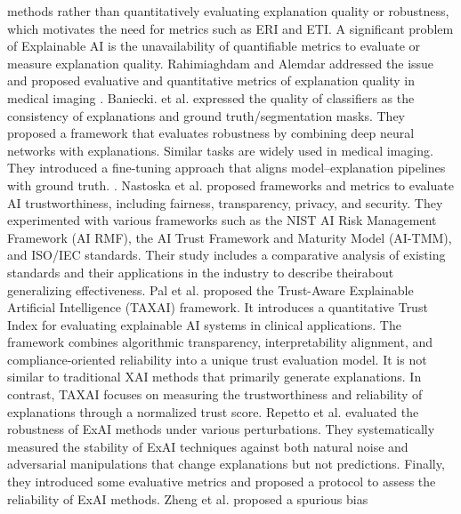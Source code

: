 \documentclass[a4paper,fleqn]{cas-dc}
\begin{document}
methods rather than quantitatively evaluating explanation quality or robustness, which motivates the need for metrics such as ERI and ETI. A significant problem of Explainable AI is the unavailability of quantifiable metrics to evaluate or measure explanation quality. Rahimiaghdam and Alemdar addressed the issue and proposed evaluative and quantitative metrics of explanation quality in medical imaging \cite{r21}. Baniecki.
et al. expressed the quality of classifiers as the consistency of explanations and ground truth/segmentation masks. They proposed a framework that evaluates robustness by combining deep neural networks with explanations. Similar tasks are widely used in medical imaging. They introduced a fine-tuning approach that aligns model–explanation pipelines with ground truth. \cite{r22}. Nastoska et al. proposed frameworks and metrics to evaluate AI trustworthiness, including fairness, transparency, privacy, and security\cite{r23}. They experimented with various frameworks such as the NIST AI Risk Management Framework (AI RMF), the AI Trust Framework and Maturity Model (AI-TMM), and ISO/IEC standards. Their study includes a comparative analysis of existing standards and their applications in the industry to describe theirabout generalizing effectiveness. Pal et al. proposed the Trust-Aware Explainable Artificial Intelligence (TAXAI) framework. It introduces a quantitative Trust Index for evaluating explainable AI systems in clinical applications\cite{r24}. The framework combines algorithmic transparency, interpretability alignment, and compliance-oriented reliability into a unique trust evaluation model. It is not similar to traditional XAI methods that primarily generate explanations. In contrast, TAXAI focuses on measuring the trustworthiness and reliability of explanations through a normalized trust score. Repetto et al. evaluated the robustness of ExAI methods under various perturbations. They systematically measured the stability of ExAI techniques against both natural noise and adversarial manipulations that change explanations but not predictions. Finally, they introduced some evaluative metrics and proposed a protocol to assess the reliability of ExAI methods\cite{r25}. Zheng et al. proposed a spurious bias
\end{document}
